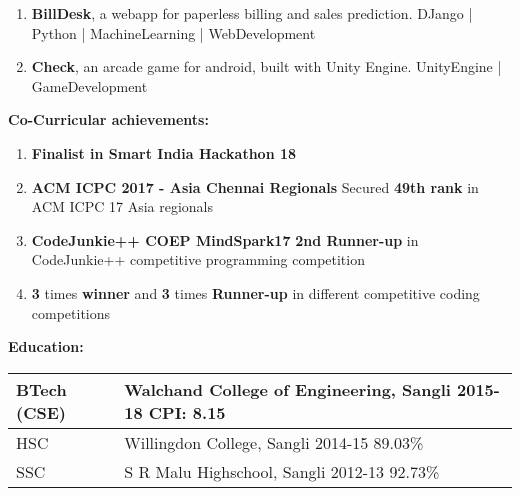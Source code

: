 \documentclass[11pt]{article}
\begin{document}
\begin{center}
\begin{minipage}[t]{0.6\textwidth}
\begin{LARGE}
{\begin{enumerate}
						ExtensionDevelopment | JS | HTML | CSS
						\item \textbf{BillDesk}, a webapp for paperless billing and sales prediction.\linebreak
						DJango | Python | MachineLearning | WebDevelopment
						\item \textbf{Check}, an arcade game for android, built with Unity Engine.\linebreak
						UnityEngine | GameDevelopment
					\end{enumerate}
				}
			\end{LARGE}
			\vspace{0.55cm}
            \begin{LARGE}
				\textbf{Co-Curricular achievements:}\medskip%
				{\small
					\begin{enumerate}
						\item \textbf{Finalist in Smart India Hackathon 18}
						\item \textbf{ACM ICPC 2017 - Asia Chennai Regionals}\linebreak
						Secured \textbf{49th rank} in ACM ICPC 17 Asia regionals
						\item \textbf{CodeJunkie++ COEP MindSpark17}\linebreak
						\textbf{2nd Runner-up} in CodeJunkie++ competitive programming competition
						\item \textbf{3} times \textbf{winner} and \textbf{3} times \textbf{Runner-up} in different competitive coding competitions
					\end{enumerate}
				}
			\end{LARGE}
			\vspace{0.55cm}
            \begin{LARGE}
				\textbf{Education:}
				\medskip\linebreak%
				\begin{tabu} to \textwidth {X[1.15l]X[6l]}
			   		\normalsize BTech (CSE) & {\normalsize Walchand College of Engineering, Sangli} \linebreak \normalsize 2015-18 \hspace{1cm}\normalsize CPI: 8.15\medskip\\
			   		\hline
			   		\normalsize HSC & \normalsize Willingdon College, Sangli \linebreak \normalsize 2014-15 \hspace{1cm}\normalsize 89.03\%\medskip\\
					\hline
				    \normalsize SSC & \normalsize S R Malu Highschool, Sangli \linebreak\large 2012-13 \hspace{1cm}\normalsize 92.73\%\medskip\\

\end{tabu}
\end{LARGE}
\end{minipage}
\end{center}
\end{document}
